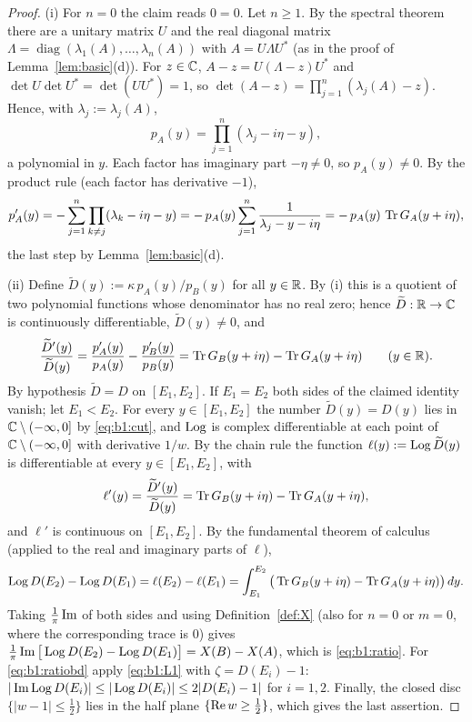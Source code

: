 \begin{proof}
(i) For $n=0$ the claim reads $0=0$. Let $n\ge1$. By the spectral theorem there are a unitary matrix $U$ and the real diagonal matrix
$\Lambda=\operatorname{diag}(\lambda_1(A),\dots,\lambda_n(A))$ with $A=U\Lambda U^*$ (as in the proof of Lemma~\ref{lem:basic}(d)). For $z\in\mathbb{C}$,
$A-z=U(\Lambda-z)U^*$ and $\det U\det U^*=\det(UU^*)=1$, so $\det(A-z)=\prod_{j=1}^n(\lambda_j(A)-z)$. Hence, with $\lambda_j:=\lambda_j(A)$,
\[
p_A(y)=\prod_{j=1}^n(\lambda_j-i\eta-y),
\]
a polynomial in $y$. Each factor has imaginary part $-\eta\ne0$, so $p_A(y)\ne0$. By the product rule (each factor has derivative $-1$),
\[
p_A'(y)=-\sum_{j=1}^n\prod_{k\ne j}(\lambda_k-i\eta-y)=-\,p_A(y)\sum_{j=1}^n\frac1{\lambda_j-y-i\eta}=-\,p_A(y)\,\operatorname{Tr} G_A(y+i\eta),
\]
the last step by Lemma~\ref{lem:basic}(d).

(ii) Define $\widetilde D(y):=\kappa\,p_A(y)/p_B(y)$ for all $y\in\mathbb{R}$. By (i) this is a quotient of two polynomial functions whose denominator
has no real zero; hence $\widetilde D:\mathbb{R}\to\mathbb{C}$ is continuously differentiable, $\widetilde D(y)\ne0$, and
\begin{equation}\label{eq:b1:logder}
\frac{\widetilde D'(y)}{\widetilde D(y)}=\frac{p_A'(y)}{p_A(y)}-\frac{p_B'(y)}{p_B(y)}=\operatorname{Tr} G_B(y+i\eta)-\operatorname{Tr} G_A(y+i\eta)\qquad(y\in\mathbb{R}).
\end{equation}
By hypothesis $\widetilde D=D$ on $[E_1,E_2]$. If $E_1=E_2$ both sides of the claimed identity vanish; let $E_1<E_2$.
For every $y\in[E_1,E_2]$ the number $\widetilde D(y)=D(y)$ lies in $\mathbb{C}\setminus(-\infty,0]$ by \eqref{eq:b1:cut}, and $\operatorname{Log}$ is
complex differentiable at each point of $\mathbb{C}\setminus(-\infty,0]$ with derivative $1/w$. By the chain rule the function
$\ell(y):=\operatorname{Log}\widetilde D(y)$ is differentiable at every $y\in[E_1,E_2]$, with
\[
\ell'(y)=\frac{\widetilde D'(y)}{\widetilde D(y)}=\operatorname{Tr} G_B(y+i\eta)-\operatorname{Tr} G_A(y+i\eta),
\]
and $\ell'$ is continuous on $[E_1,E_2]$. By the fundamental theorem of calculus (applied to the real and imaginary parts of $\ell$),
\[
\operatorname{Log} D(E_2)-\operatorname{Log} D(E_1)=\ell(E_2)-\ell(E_1)=\int_{E_1}^{E_2}\big(\operatorname{Tr} G_B(y+i\eta)-\operatorname{Tr} G_A(y+i\eta)\big)\,dy .
\]
Taking $\frac1\pi\operatorname{Im}$ of both sides and using Definition~\ref{def:X} (also for $n=0$ or $m=0$, where the corresponding trace is $0$) gives
$\frac1\pi\operatorname{Im}\big[\operatorname{Log} D(E_2)-\operatorname{Log} D(E_1)\big]=X(B)-X(A)$, which is \eqref{eq:b1:ratio}. For \eqref{eq:b1:ratiobd} apply \eqref{eq:b1:L1} with
$\zeta=D(E_i)-1$: $|\operatorname{Im}\operatorname{Log} D(E_i)|\le|\operatorname{Log} D(E_i)|\le2|D(E_i)-1|$ for $i=1,2$. Finally, the closed disc $\{|w-1|\le\frac12\}$ lies in the half
plane $\{\operatorname{Re} w\ge\frac12\}$, which gives the last assertion.
\end{proof}

